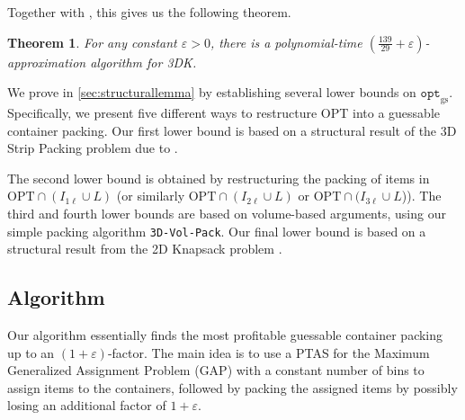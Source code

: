 \documentclass[10pt,a4paper]{amsart}
\newcommand{\ari}[1]{#1}
\renewcommand{\epsilon}{\varepsilon} %
\newcommand{\tdk}{\textsc{3DK}}
\newcommand{\boxes}{containers\xspace}
\newtheorem{theorem}{Theorem}[section]
\theoremstyle{definition}
\newcommand{\opt}{\mathtt{opt}}
\newcommand{\optgs}{\mathtt{opt}_{\mathrm{gs}}}
\begin{document}
Together with , this gives us the following theorem.


\begin{theorem}
    \ari{For any constant $\epsilon >0$, there is a polynomial-time $\left(\frac{139}{29}+\epsilon\right)$-approximation algorithm for \tdk.}
\end{theorem}
We prove  in \cref{sec:structurallemma} by establishing several lower bounds on $\optgs$. Specifically, we present five different ways to restructure OPT into a guessable container packing. Our first lower bound is based on a structural result of the 3D Strip Packing problem due to \cite{3d-strip-packing}.

The second lower bound is obtained by restructuring the packing of items in $\text{OPT}\cap (I_{1\ell}\cup L)$ (or similarly $\text{OPT}\cap (I_{2\ell}\cup L)$ or $\text{OPT}\cap (I_{3\ell} \cup L$)). The third and fourth lower bounds are based on volume-based arguments, \ari{using our simple packing algorithm \texttt{3D-Vol-Pack}.} Our final lower bound is based on a structural result from the 2D Knapsack problem \cite{2dks-Lpacking}.


\iffalse
\subsection{Algorithm}
Our algorithm essentially finds the most profitable guessable container packing up to an $(1+\epsilon)$-factor. The main idea is to use a PTAS for the Maximum Generalized Assignment Problem (GAP) with a constant number of bins to assign items to the \boxes, followed by packing the assigned items by possibly losing an additional factor of $1+\epsilon$.
\end{document}
